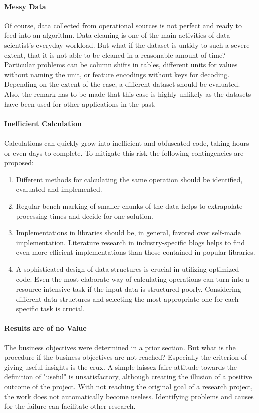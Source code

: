 \paragraph{Messy Data} Of course, data collected from operational sources is not perfect and ready to feed into an algorithm. Data cleaning is one of the main activities of data scientist's everyday workload. But what if the dataset is untidy to such a severe extent, that it is not able to be cleaned in a reasonable amount of time?
Particular problems can be column shifts in tables, different units for values without naming the unit, or feature encodings without keys for decoding.
Depending on the extent of the case, a different dataset should be evaluated. Also, the remark has to be made that this case is highly unlikely as the datasets have been used for other applications in the past.

\paragraph{Inefficient Calculation} Calculations can quickly grow into inefficient and obfuscated code, taking hours or even days to complete. To mitigate this risk the following contingencies are proposed:

\begin{enumerate}
	\item Different methods for calculating the same operation should be identified, evaluated and implemented.
	\item Regular bench-marking of smaller chunks of the data helps to extrapolate processing times and decide for one solution.
	\item Implementations in libraries should be, in general, favored over self-made implementation. Literature research in industry-specific blogs helps to find even more efficient implementations than those contained in popular libraries.
	\item A sophisticated design of data structures is crucial in utilizing optimized code. Even the most elaborate way of calculating operations can turn into a resource-intensive task if the input data is structured poorly. Considering different data structures and selecting the most appropriate one for each specific task is crucial.
\end{enumerate}

\paragraph{Results are of no Value}
The business objectives were determined in a prior section. But what is the procedure if the business objectives are not reached? Especially the criterion of giving useful insights is the crux.
A simple laissez-faire attitude towards the definition of "useful" is unsatisfactory, although creating the illusion of a positive outcome of the project.
With not reaching the original goal of a research project, the work does not automatically become useless. Identifying problems and causes for the failure can facilitate other research.

